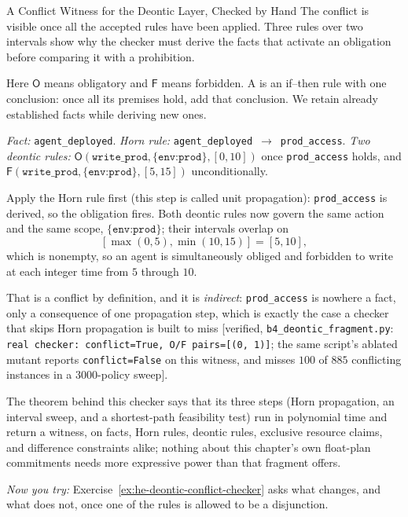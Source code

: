 \documentclass[11pt,a4paper]{article}
\theoremstyle{definition}
\theoremstyle{definition}
\theoremstyle{remark}
\begin{document}
\begin{pdexample}{A Conflict Witness for the Deontic Layer, Checked by Hand}
\setlength{\parskip}{4pt plus 1pt}
The conflict is visible once all the accepted rules have been applied.
Three rules over two intervals show why the checker must derive the facts
that activate an obligation before comparing it with a prohibition.

Here $\mathsf O$ means obligatory and $\mathsf F$ means forbidden. A 
is an if--then rule with one conclusion: once all its premises hold, add that
conclusion. We retain already established facts while deriving new ones.

\emph{Fact:} \texttt{agent\_deployed}. \emph{Horn rule:}
\texttt{agent\_deployed}~$\to$~\texttt{prod\_access}. \emph{Two deontic rules:}
$\mathsf O(\texttt{write\_prod},\{\texttt{env:prod}\},[0,10])$ once \texttt{prod\_access}
holds, and $\mathsf F(\texttt{write\_prod},\{\texttt{env:prod}\},[5,15])$ unconditionally.

Apply the Horn rule first (this step is called unit propagation):
\texttt{prod\_access} is derived, so the obligation fires. Both deontic rules now govern the same action and the same
scope, $\{\texttt{env:prod}\}$; their intervals overlap on
\[
[\max(0,5),\min(10,15)]=[5,10],
\] which is nonempty, so an agent is simultaneously
obliged and forbidden to write at each integer time from $5$ through $10$.

That is a conflict
by definition, and it is \emph{indirect}: \texttt{prod\_access} is nowhere a
fact, only a consequence of one propagation step, which is exactly the case a
checker that skips Horn propagation is built to miss [verified,
\texttt{b4\_deontic\_fragment.py}: \texttt{real checker: conflict=True, O/F
pairs=[(0, 1)]}; the same script's ablated mutant reports
\texttt{conflict=False} on this witness, and misses $100$ of $885$ conflicting
instances in a $3000$-policy sweep].

The theorem behind this checker says that its three steps (Horn
propagation, an interval sweep, and a shortest-path feasibility test) run in
polynomial time and return a witness, on facts, Horn rules, deontic rules, exclusive resource claims, and
difference constraints alike; nothing about this chapter's own float-plan
commitments needs more expressive power than that fragment offers.

\emph{Now you try:} Exercise~\ref{ex:he-deontic-conflict-checker} asks what
changes, and what does not, once one of the rules is allowed to be a
disjunction.
\end{pdexample}
\end{document}
